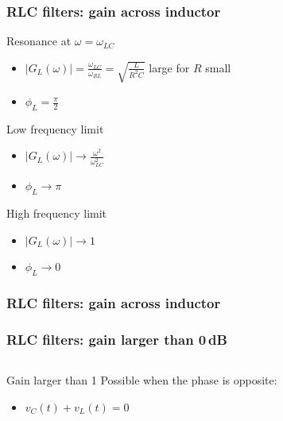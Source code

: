 \documentclass[beamer]{standalone}
\begin{document}
\begin{frame}
 \frametitle{RLC filters: gain across inductor}
 \begin{block}{Resonance at $\omega = \omega_{LC}$}
  \begin{itemize}
   \item $|G_L(\omega)| = \frac{\omega_{LC}}{\omega_{RL}} = \sqrt{\frac{L}{R^2 C}}$ large for $R$ small
   \item $\phi_L = \frac{\pi}{2}$
  \end{itemize}
 \end{block}
 \begin{block}{Low frequency limit}
  \begin{itemize}
   \item $|G_L(\omega)| \to \frac{\omega^2}{\omega_{LC}^2}$
   \item $\phi_L \to \pi$
  \end{itemize}
 \end{block}
 \begin{block}{High frequency limit}
  \begin{itemize}
   \item $|G_L(\omega)| \to 1$
   \item $\phi_L \to 0$
  \end{itemize}
 \end{block}
\end{frame}

\begin{frame}
 \frametitle{RLC filters: gain across inductor}
 \begin{center}
 \end{center}
\end{frame}

\begin{frame}
 \frametitle{RLC filters: gain larger than 0\,dB}
 \begin{columns}
  \begin{column}{0.5\textwidth}
  \end{column}
  \begin{column}{0.5\textwidth}
  \end{column}
 \end{columns}
 \begin{block}{Gain larger than 1}
  Possible when the phase is opposite:
  \begin{itemize}
   \item $v_C(t) + v_L(t) = 0$
  \end{itemize}
 \end{block}
\end{frame}
\end{document}
